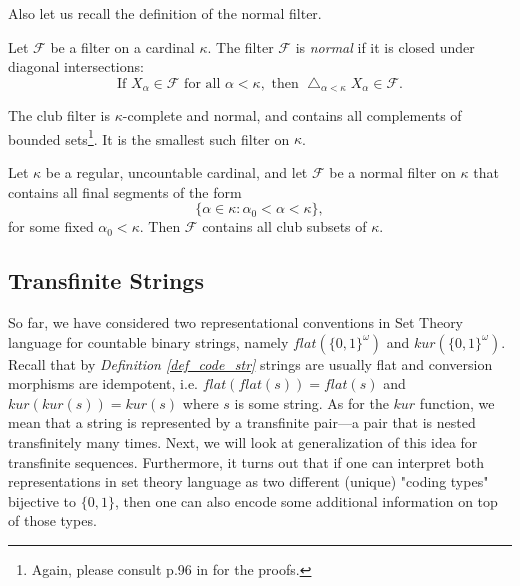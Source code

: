 Also let us recall\cite{jech2003set} the definition of the normal filter.

\begin{definition}\label{def_normal_filter}
    Let \( \mathcal{F} \) be a filter on a cardinal \( \kappa \). The filter \( \mathcal{F} \) is \textit{normal} if it is closed under diagonal intersections:
\begin{equation}\label{eq:normal_filter}
    \text{If } X_\alpha \in \mathcal{F} \text{ for all } \alpha < \kappa, \text{ then } \bigtriangleup_{\alpha < \kappa} X_\alpha \in \mathcal{F}.
\end{equation}
\end{definition}

The club filter is \( \kappa \)-complete and normal, and contains all complements of bounded sets\footnote{Again, please consult p.96 in \cite{jech2003set} for the proofs.}. It is the smallest such filter on \( \kappa \).

\begin{lemma}\label{lemma_closed_unbounded_filter}
    Let \(\kappa\) be a regular, uncountable cardinal, and let \(\mathcal{F}\) be a normal filter on \(\kappa\) that contains all final segments of the form 
    \[
    \{\alpha \in \kappa : \alpha_0 < \alpha < \kappa\}, 
    \]
    for some fixed \(\alpha_0 < \kappa\). Then \(\mathcal{F}\) contains all club subsets of \(\kappa\).
\end{lemma}

\subsection{Transfinite Strings}\label{subsection_transfinite_strings}

So far, we have considered two representational conventions in Set Theory language for countable binary strings, namely $flat(\{0,1\}^\omega)$ and $kur(\{0,1\}^\omega)$. Recall that by \textit{Definition \ref{def_code_str}} strings are usually flat and conversion morphisms are idempotent, i.e. $flat(flat(s)) = flat(s)$ and $kur(kur(s)) = kur(s)$ where $s$ is some string. As for the $kur$ function, we mean that a string is represented by a transfinite pair—a pair that is nested transfinitely many times. Next, we will look at generalization of this idea for transfinite sequences. Furthermore, it turns out that if one can interpret both representations in set theory language as two different (unique) "coding types" bijective to $\{0,1\}$, then one can also encode some additional information on top of those types. 

